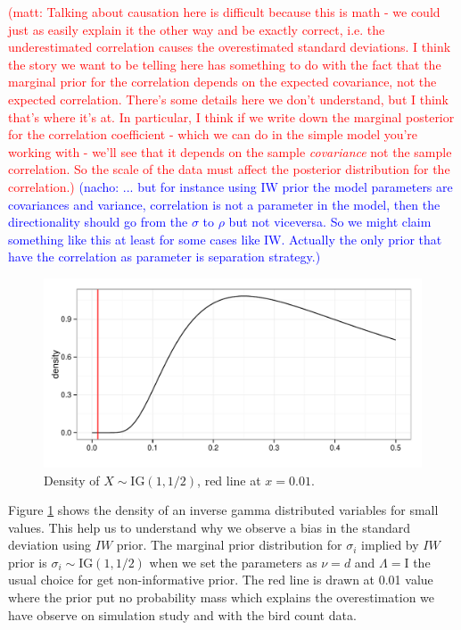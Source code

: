 \documentclass[a4paper]{article}
\newcommand{\nacho}[1]{\textcolor{blue}{(nacho: #1)}}
\newcommand{\matt}[1]{\textcolor{red}{(matt: #1)}}
\newcommand{\I}{\mathrm{I}}
\begin{document}
\matt{Talking about causation here is difficult because this is math - we could just as easily explain it the other way and be exactly correct, i.e. the underestimated correlation causes the overestimated standard deviations. I think the story we want to be telling here has something to do with the fact that the marginal prior for the correlation depends on the expected covariance, not the expected correlation. There's some details here we don't understand, but I think that's where it's at. In particular, I think if we write down the marginal posterior for the correlation coefficient - which we can do in the simple model you're working with - we'll see that it depends on the sample {\it covariance} not the sample correlation. So the scale of the data must affect the posterior distribution for the correlation.}
\nacho{... but for instance using IW prior the model parameters are covariances and variance, correlation is not a parameter in the model, then the directionality should go from the $\sigma$ to $\rho$ but not viceversa. So we might claim something like this at least for some cases like IW. Actually the only prior that have the correlation as parameter is separation strategy.}


\begin{figure}[hbpt]
\centering
\includegraphics[width=\textwidth]{ig}
 \vspace{-.5in}
\caption{Density of $X\sim \mbox{IG}(1, 1/2)$, red line at $x=0.01$. \label{igamma} }
\end{figure}

Figure \ref{igamma} shows the density of an inverse gamma distributed variables for small values. This help us to understand why we observe a bias in the standard deviation using $IW$ prior. The marginal prior distribution for $\sigma_i$ implied by $IW$ prior is $\sigma_i \sim \mbox{IG}(1, 1/2)$ when we set the parameters as $\nu = d$ and $\Lambda=\I$ the usual choice for get non-informative prior. The red line is drawn at 0.01 value where the prior put no probability mass which explains the overestimation we have observe on simulation study and with the bird count data. 
\end{document}

